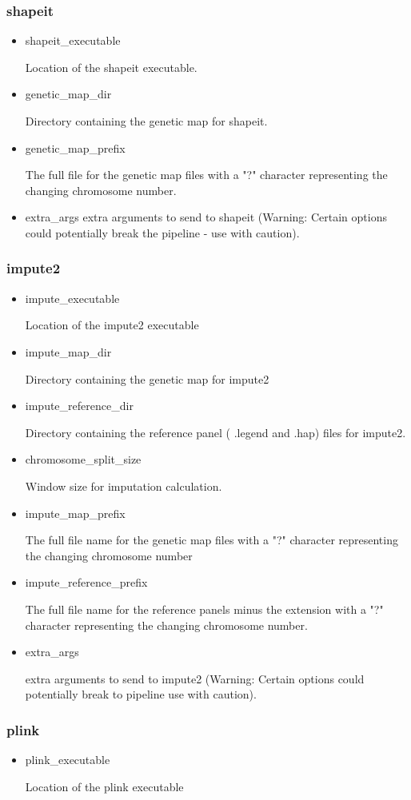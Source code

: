 \documentclass[a4paper,10pt]{article}
\begin{document}
\subsubsection{shapeit}
\begin{itemize}
\item shapeit\_executable

Location of the shapeit executable.
\item genetic\_map\_dir 

Directory containing the genetic map for shapeit.
\item genetic\_map\_prefix 

The full file for the genetic map files with a "?" character representing the changing chromosome number.
\item extra\_args 
extra arguments to send to shapeit (Warning: Certain options could
potentially break the pipeline  - use with caution).
\end{itemize}
\subsubsection{impute2}
\begin{itemize}
\item impute\_executable 

Location of the impute2 executable
\item impute\_map\_dir

Directory containing the genetic map for impute2
\item impute\_reference\_dir 

Directory containing the reference panel ( .legend and .hap) files for impute2.
\item chromosome\_split\_size

Window size for imputation calculation.
\item impute\_map\_prefix

The full file name for the genetic map files with a "?" character
representing the changing chromosome number
\item impute\_reference\_prefix

The full file name for the reference panels minus the extension with a
"?" character representing the changing chromosome number.
\item extra\_args

extra arguments to send to impute2 (Warning: Certain options could
potentially break to pipeline use with caution).
\end{itemize}
\subsubsection{plink}
\begin{itemize}
\item plink\_executable 

Location of the plink executable
\end{itemize}
\end{document}
